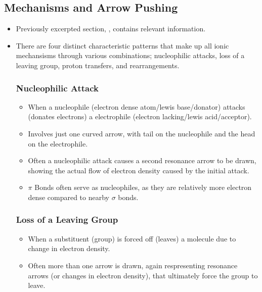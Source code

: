 \documentclass[12pt,a4paper]{article}
\begin{document}
\subsection{Mechanisms and Arrow Pushing}\label{Mechanisms and Arrow Puhsing}
\begin{itemize}
    \item {\color{darklc}Previously excerpted section, {\color{G-Moon}}, contains relevant information.}
    \item There are four distinct characteristic patterns that {\color{o-Sun}make up all ionic mechansisms} through various combinations; nucleophilic attacks, loss of a leaving group, proton transfers, and rearrangements.
    \subsubsection{Nucleophilic Attack}
    \begin{itemize}
        \item When a {\color{neg}nucleophile (electron dense atom/lewis base/donator)} attacks (donates electrons) a {\color{pos}electrophile (electron lacking/lewis acid/acceptor)}.
        \item Involves just one curved arrow, with tail on the nucleophile and the head on the electrophile.
        \item Often a nucleophilic attack causes a second {\color{o-Sun}resonance arrow} to be drawn, showing the actual flow of electron density caused by the initial attack.
        \item $\pi$ Bonds often serve as nucleophiles, as they are relatively more electron dense compared to nearby $\sigma$ bonds.
    \end{itemize}
    \subsubsection{Loss of a Leaving Group}
    \begin{itemize}
        \item When a substituent (group) is forced off (leaves) a molecule due to change in electron density.
        \item Often more than one arrow is drawn, again respresenting resonance arrows (or changes in electron density), that ultimately force the group to leave.
    \end{itemize}

\end{itemize}
\end{document}
